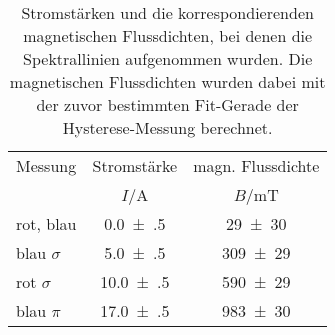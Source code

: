 \begin{table}[!h]
	\centering
	\begin{tabular}{lcc}
		\toprule
		Messung & Stromstärke & magn. Flussdichte\\
		& $I$/\si{\ampere} & $B$/\si{\milli\tesla}\\
\midrule
		rot, blau&\num{0.0(5)} & \num{29(30)}\\
		blau $\sigma$ &\num{5.0(5)} & \num{309(29)}\\
		rot $\sigma$ &\num{10.0(5)} & \num{590(29)}\\
		blau $\pi$ &\num{17.0(5)} & \num{983(30)}\\
		\bottomrule
	\end{tabular}
	\caption{Stromstärken und die korrespondierenden magnetischen Flussdichten,
                    bei denen die Spektrallinien aufgenommen wurden.
                    Die magnetischen Flussdichten wurden dabei mit der zuvor bestimmten Fit-Gerade der
                    Hysterese-Messung berechnet. \label{tab:strom_magnetfeld}}
\end{table}
